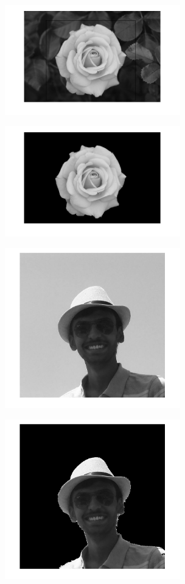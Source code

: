 \documentclass[a4paper]{article}
\begin{document}
\begin{figure}[h]
\begin{subfigure}{.5\textwidth}
  \centering
  \includegraphics[width = 3in]{rose_input_h.png}
  \label{fig:sfig1}
\end{subfigure}%
\begin{subfigure}{.5\textwidth}
  \centering
  \includegraphics[width = 3in]{rose_output_h.png}
  \label{fig:sfig2}
\end{subfigure}


\begin{subfigure}{.5\textwidth}
  \centering
  \includegraphics[width = 3in]{varun_input_h.png}
  \label{fig:sfig2}
\end{subfigure}
\begin{subfigure}{.5\textwidth}
  \centering
  \includegraphics[width = 3in]{varun_output_h.png}
  \label{fig:sfig2}
\end{subfigure}


\end{figure}
\end{document}
